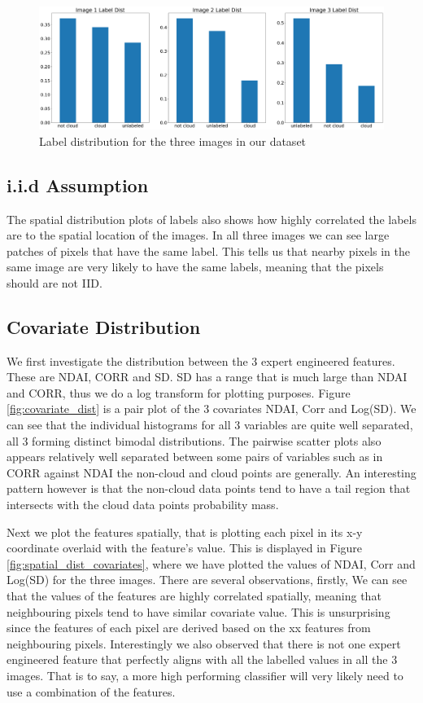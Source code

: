 \documentclass[11pt, letterpaper, journal]{IEEEtran}
\begin{document}
\begin{figure}[!h]
\centering
\includegraphics[width=1.0\textwidth]{statics/Label_dist.png}
\caption{Label distribution for the three images in our dataset}
\label{fig:label_dist}
\end{figure}

\subsection{i.i.d Assumption}
The spatial distribution plots of labels also shows how highly correlated the labels are to the spatial location of the images. In all three images we can see large patches of pixels that have the same label. This tells us that nearby pixels in the same image are very likely to have the same labels, meaning that the pixels should are not IID.

\subsection{Covariate Distribution}
We first investigate the distribution between the 3 expert engineered features. These are NDAI, CORR and SD. SD has a range that is much large than NDAI and CORR, thus we do a log transform for plotting purposes. Figure \ref{fig:covariate_dist} is a pair plot of the 3 covariates NDAI, Corr and Log(SD). We can see that the individual histograms for all 3 variables are quite well separated, all 3 forming distinct bimodal distributions. The pairwise scatter plots also appears relatively well separated between some pairs of variables such as in CORR against NDAI the non-cloud and cloud points are generally. An interesting pattern however is that the non-cloud data points tend to have a tail region that intersects with the cloud data points probability mass.

Next we plot the features spatially, that is plotting each pixel in its x-y coordinate overlaid with the feature's value. This is displayed in Figure \ref{fig:spatial_dist_covariates}, where we have plotted the values of NDAI, Corr and Log(SD) for the three images. There are several observations, firstly, We can see that the values of the features are highly correlated spatially, meaning that neighbouring pixels tend to have similar covariate value. This is unsurprising since the features of each pixel are derived based on the xx features from neighbouring pixels. Interestingly we also observed that there is not one expert engineered feature that perfectly aligns with all the labelled values in all the 3 images. That is to say, a more high performing classifier will very likely need to use a combination of the features.
\end{document}
